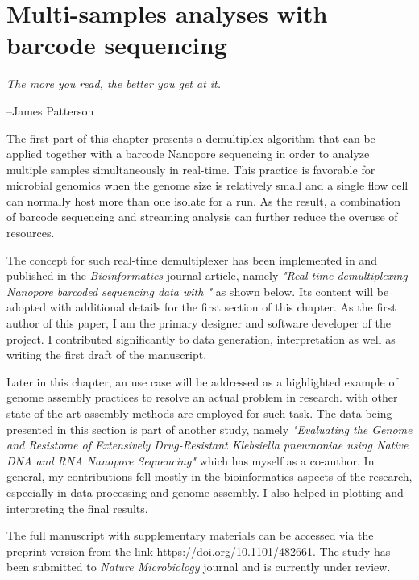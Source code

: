 \chapter{Multi-samples analyses with barcode sequencing}\label{ch:npbarcode}
\thispagestyle{empty}
\vspace*{\fill}
\epigraph{\emph{The more you read, the better you get at it.}}
{--James Patterson}

\clearpage
The first part of this chapter presents a demultiplex algorithm that can be applied together with a barcode Nanopore sequencing in order to analyze multiple samples simultaneously in real-time. This practice is favorable for microbial genomics when the genome size is relatively small and a single flow cell can normally host more than one isolate for a run. As the result, a combination of barcode sequencing and streaming analysis can further reduce the overuse of resources.

The concept for such real-time demultiplexer has been implemented in \npbarcode{} and published in the \emph{Bioinformatics} journal article, namely \emph{"Real-time demultiplexing Nanopore barcoded sequencing data with \npbarcode{}"} as shown below. Its content will be adopted with additional details for the first section of this chapter. 
As the first author of this paper, I am the primary designer and software developer of the project. I contributed significantly to data generation, interpretation as well as writing the first draft of the manuscript.

Later in this chapter, an use case will be addressed as a highlighted example of genome assembly practices to resolve an actual problem in research. \npscarf{} with other state-of-the-art assembly methods are employed for such task.
The data being presented in this section is part of another study, namely \emph{"Evaluating the Genome and Resistome of Extensively Drug-Resistant Klebsiella pneumoniae using Native DNA and RNA Nanopore Sequencing"} which has myself as a co-author. 
In general, my contributions fell mostly in the bioinformatics aspects of the research, especially in data processing and genome assembly. I also helped in plotting and interpreting the final results. 

The full manuscript with supplementary materials can be accessed via the preprint version from the link \url{https://doi.org/10.1101/482661}. The study has been submitted to \emph{Nature Microbiology} journal and is currently under review.

